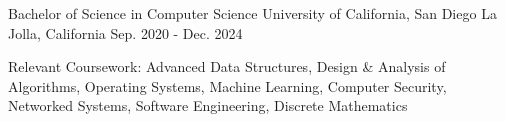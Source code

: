 

\begin{cventries}

  \cventry
    {Bachelor of Science in Computer Science} %
    {University of California, San Diego} %
    {La Jolla, California} %
    {Sep. 2020 - Dec. 2024} %
    {
      \begin{cvitems}
        \item {Relevant Coursework: Advanced Data Structures, Design \& Analysis of Algorithms, Operating Systems, Machine Learning, Computer Security, Networked Systems, Software Engineering, Discrete Mathematics}
      \end{cvitems}
    }
\end{cventries}